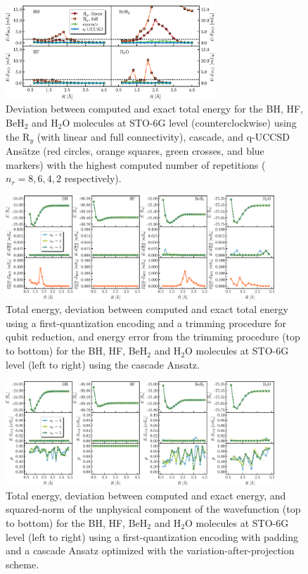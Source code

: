 \documentclass[aps,pra,twocolumn]{revtex4-2}
\begin{document}
\begin{figure}[t!]
\includegraphics[width=0.7\textwidth]{../figures/second_quantization_comparison/second_quantization_comparison.eps}
\caption{Deviation between computed and exact total energy for the BH, HF, BeH$_2$ and H$_2$O molecules at STO-6G level (counterclockwise) 
using the R$_y$ (with linear and full connectivity), cascade, and q-UCCSD Ans\"{a}tze (red circles, orange squares, green crosses, and blue markers)
with the highest computed number of repetitions ($n_r=8,6,4,2$ respectively).}
\label{figure:second_h2o}
\end{figure} 

\begin{figure}[t!]
\includegraphics[width=0.9\textwidth]{../figures/first_quantization_trim/first_quantization_trim.eps}
\caption{Total energy, deviation between computed and exact total energy using a first-quantization encoding and a trimming procedure for qubit reduction,
and energy error from the trimming procedure (top to bottom) for the BH, HF, BeH$_2$ and H$_2$O molecules at STO-6G level (left to right) 
using the cascade Ansatz.}
\label{figure:first_trim}
\end{figure} 

\begin{figure}[t!]
\includegraphics[width=0.9\textwidth]{../figures/first_quantization_pad_vap_cascade/first_quantization_pad_vap_cascade.eps}
\caption{Total energy, deviation between computed and exact energy, and squared-norm of the unphysical component of the wavefunction
(top to bottom) for the BH, HF, BeH$_2$ and H$_2$O molecules at STO-6G level (left to right) 
using a first-quantization encoding with padding and a cascade Ansatz optimized with the variation-after-projection scheme.}
\label{figure:first_pad_vap_cascade}
\end{figure} 
\end{document}
